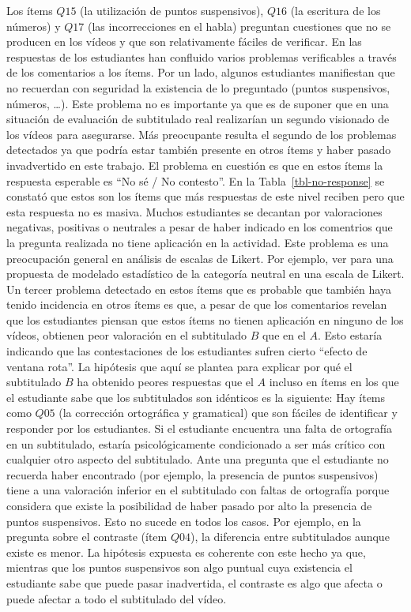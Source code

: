 \documentclass[
  12pt,
  a4paper,
  extrafontsizes,
  onecolumn,
  openright,
  table]{memoir}
\begin{document}
Los ítems \(Q15\) (la utilización de puntos suspensivos), \(Q16\) (la
escritura de los números) y \(Q17\) (las incorrecciones en el habla)
preguntan cuestiones que no se producen en los vídeos y que son
relativamente fáciles de verificar. En las respuestas de los estudiantes
han confluido varios problemas verificables a través de los comentarios
a los ítems. Por un lado, algunos estudiantes manifiestan que no
recuerdan con seguridad la existencia de lo preguntado (puntos
suspensivos, números, \ldots). Este problema no es importante ya que es
de suponer que en una situación de evaluación de subtitulado real
realizarían un segundo visionado de los vídeos para asegurarse. Más
preocupante resulta el segundo de los problemas detectados ya que podría
estar también presente en otros ítems y haber pasado invadvertido en
este trabajo. El problema en cuestión es que en estos ítems la respuesta
esperable es \enquote{No sé / No contesto}. En la
Tabla~\ref{tbl-no-response} se constató que estos son los ítems que más
respuestas de este nivel reciben pero que esta respuesta no es masiva.
Muchos estudiantes se decantan por valoraciones negativas, positivas o
neutrales a pesar de haber indicado en los comentrios que la pregunta
realizada no tiene aplicación en la actividad. Este problema es una
preocupación general en análisis de escalas de Likert. Por ejemplo, ver
\textcite{tutz2020} para una propuesta de modelado estadístico de la
categoría neutral en una escala de Likert. Un tercer problema detectado
en estos ítems que es probable que también haya tenido incidencia en
otros ítems es que, a pesar de que los comentarios revelan que los
estudiantes piensan que estos ítems no tienen aplicación en ninguno de
los vídeos, obtienen peor valoración en el subtitulado \(B\) que en el
\(A\). Esto estaría indicando que las contestaciones de los estudiantes
sufren cierto \enquote{efecto de ventana rota}. La hipótesis que aquí se
plantea para explicar por qué el subtitulado \(B\) ha obtenido peores
respuestas que el \(A\) incluso en ítems en los que el estudiante sabe
que los subtitulados son idénticos es la siguiente: Hay ítems como
\(Q05\) (la corrección ortográfica y gramatical) que son fáciles de
identificar y responder por los estudiantes. Si el estudiante encuentra
una falta de ortografía en un subtitulado, estaría psicológicamente
condicionado a ser más crítico con cualquier otro aspecto del
subtitulado. Ante una pregunta que el estudiante no recuerda haber
encontrado (por ejemplo, la presencia de puntos suspensivos) tiene a una
valoración inferior en el subtitulado con faltas de ortografía porque
considera que existe la posibilidad de haber pasado por alto la
presencia de puntos suspensivos. Esto no sucede en todos los casos. Por
ejemplo, en la pregunta sobre el contraste (ítem \(Q04\)), la diferencia
entre subtitulados aunque existe es menor. La hipótesis expuesta es
coherente con este hecho ya que, mientras que los puntos suspensivos son
algo puntual cuya existencia el estudiante sabe que puede pasar
inadvertida, el contraste es algo que afecta o puede afectar a todo el
subtitulado del vídeo.
\end{document}
